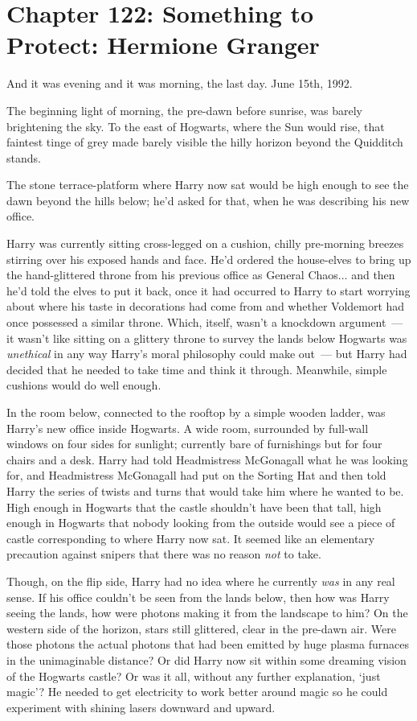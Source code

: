\chapter{Chapter 122: Something to Protect: Hermione Granger}
And it was evening and it was morning, the last day. June 15th, 1992.

The beginning light of morning, the pre-dawn before sunrise, was barely brightening the sky. To the east of Hogwarts, where the Sun would rise, that faintest tinge of grey made barely visible the hilly horizon beyond the Quidditch stands.

The stone terrace-platform where Harry now sat would be high enough to see the dawn beyond the hills below; he'd asked for that, when he was describing his new office.

Harry was currently sitting cross-legged on a cushion, chilly pre-morning breezes stirring over his exposed hands and face. He'd ordered the house-elves to bring up the hand-glittered throne from his previous office as General Chaos... and then he'd told the elves to put it back, once it had occurred to Harry to start worrying about where his taste in decorations had come from and whether Voldemort had once possessed a similar throne. Which, itself, wasn't a knockdown argument~--- it wasn't like sitting on a glittery throne to survey the lands below Hogwarts was \emph{unethical} in any way Harry's moral philosophy could make out~--- but Harry had decided that he needed to take time and think it through. Meanwhile, simple cushions would do well enough.

In the room below, connected to the rooftop by a simple wooden ladder, was Harry's new office inside Hogwarts. A wide room, surrounded by full-wall windows on four sides for sunlight; currently bare of furnishings but for four chairs and a desk. Harry had told Headmistress McGonagall what he was looking for, and Headmistress McGonagall had put on the Sorting Hat and then told Harry the series of twists and turns that would take him where he wanted to be. High enough in Hogwarts that the castle shouldn't have been that tall, high enough in Hogwarts that nobody looking from the outside would see a piece of castle corresponding to where Harry now sat. It seemed like an elementary precaution against snipers that there was no reason \emph{not} to take.

Though, on the flip side, Harry had no idea where he currently \emph{was} in any real sense. If his office couldn't be seen from the lands below, then how was Harry seeing the lands, how were photons making it from the landscape to him? On the western side of the horizon, stars still glittered, clear in the pre-dawn air. Were those photons the actual photons that had been emitted by huge plasma furnaces in the unimaginable distance? Or did Harry now sit within some dreaming vision of the Hogwarts castle? Or was it all, without any further explanation, `just magic'? He needed to get electricity to work better around magic so he could experiment with shining lasers downward and upward.

